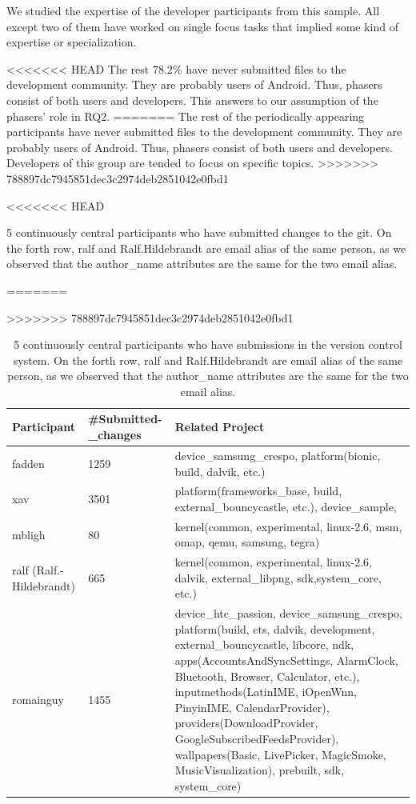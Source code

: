 \documentclass[conference]{IEEEtran}
\begin{document}
We studied the expertise of the developer participants from this
sample. All except two of them have worked on single focus tasks that
implied some kind of expertise or specialization.

<<<<<<< HEAD
The rest $78.2\%$ have never
submitted files to the development community. They are probably users
of Android. Thus, phasers consist of both users and
developers. This answers to our assumption of the phasers' role in RQ2.
=======
The rest of the periodically appearing participants have never
submitted files to the development community. They are probably users
of Android. Thus, phasers consist of both users and
developers. Developers of this group are tended to focus on specific
topics.
>>>>>>> 788897dc7945851dec3c2974deb2851042e0fbd1



\begin{table}[!t]
<<<<<<< HEAD
\caption{5 continuously central participants who have submitted changes to the git. On the forth row, ralf and Ralf.Hildebrandt are email alias of the same person, as we observed that the author\_name attributes are the same for the two email alias.}
=======
\caption{5 continuously central participants who have submissions in the version control system. On the forth row, ralf and Ralf.Hildebrandt are email alias of the same person, as we observed that the author\_name attributes are the same for the two email alias.}
>>>>>>> 788897dc7945851dec3c2974deb2851042e0fbd1
\label{continuous_project}
\centering
\begin{tabular}{|p{1.2cm}|p{1.1cm}|p{4.6cm}|}
\hline
Participant & \#Submitted-\_changes & Related Project \\
\hline
fadden & 1259 & device\_samsung\_crespo, platform(bionic, build, dalvik, etc.) \\
\hline
xav & 3501 & platform(frameworks\_base, build, external\_bouncycastle, etc.), device\_sample, \\
\hline
mbligh & 80 & kernel(common, experimental, linux-2.6, msm, omap, qemu, samsung, tegra) \\
\hline
ralf (Ralf.-Hildebrandt) & 665 & kernel(common, experimental, linux-2.6, dalvik, external\_libpng, sdk,system\_core, etc.) \\
\hline
romainguy & 1455 & device\_htc\_passion, device\_samsung\_crespo, platform(build, cts, dalvik, development, external\_bouncycastle, libcore, ndk, apps(AccountsAndSyncSettings, AlarmClock,
Bluetooth, Browser, Calculator, etc.),
inputmethods(LatinIME, iOpenWnn, PinyinIME, CalendarProvider),
providers(DownloadProvider, GoogleSubscribedFeedsProvider), wallpapers(Basic, LivePicker,
MagicSmoke, MusicVisualization), prebuilt, sdk, system\_core) \\
\hline
\end{tabular}
\end{table}
\end{document}
